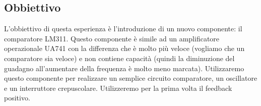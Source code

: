 \subsection{Obbiettivo}

L'obbiettivo di questa esperienza è l'introduzione di un nuovo componente:
il comparatore LM311. Questo componente è simile ad un amplificatore
operazionale UA741 con la differenza che è molto più veloce (vogliamo che un
comparatore sia veloce) e non contiene capacità (quindi la diminuzione del
guadagno all'aumentare della frequenza è molto meno marcata). Utilizzaremo
questo componente per realizzare un semplice circuito comparatore, un
oscillatore e un interruttore crepuscolare. Utilizzeremo per la prima volta
il feedback positivo.
